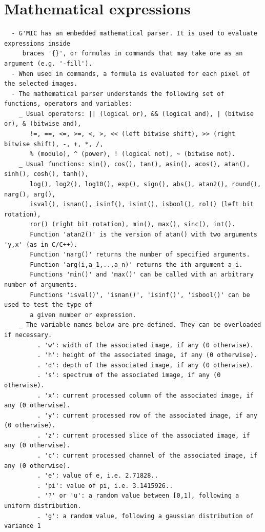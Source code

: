 \documentclass[a4paper,11pt,twoside]{book}
\begin{document}
\section{Mathematical expressions}
\small
\begin{lstlisting}
  - G'MIC has an embedded mathematical parser. It is used to evaluate expressions inside 
     braces '{}', or formulas in commands that may take one as an argument (e.g. '-fill'). 
  - When used in commands, a formula is evaluated for each pixel of the selected images. 
  - The mathematical parser understands the following set of functions, operators and variables: 
    _ Usual operators: || (logical or), && (logical and), | (bitwise or), & (bitwise and), 
       !=, ==, <=, >=, <, >, << (left bitwise shift), >> (right bitwise shift), -, +, *, /, 
       % (modulo), ^ (power), ! (logical not), ~ (bitwise not). 
    _ Usual functions: sin(), cos(), tan(), asin(), acos(), atan(), sinh(), cosh(), tanh(), 
       log(), log2(), log10(), exp(), sign(), abs(), atan2(), round(), narg(), arg(), 
       isval(), isnan(), isinf(), isint(), isbool(), rol() (left bit rotation), 
       ror() (right bit rotation), min(), max(), sinc(), int(). 
       Function 'atan2()' is the version of atan() with two arguments 'y,x' (as in C/C++). 
       Function 'narg()' returns the number of specified arguments. 
       Function 'arg(i,a_1,..,a_n)' returns the ith argument a_i. 
       Functions 'min()' and 'max()' can be called with an arbitrary number of arguments. 
       Functions 'isval()', 'isnan()', 'isinf()', 'isbool()' can be used to test the type of 
       a given number or expression. 
    _ The variable names below are pre-defined. They can be overloaded if necessary. 
         . 'w': width of the associated image, if any (0 otherwise). 
         . 'h': height of the associated image, if any (0 otherwise). 
         . 'd': depth of the associated image, if any (0 otherwise). 
         . 's': spectrum of the associated image, if any (0 otherwise). 
         . 'x': current processed column of the associated image, if any (0 otherwise). 
         . 'y': current processed row of the associated image, if any (0 otherwise). 
         . 'z': current processed slice of the associated image, if any (0 otherwise). 
         . 'c': current processed channel of the associated image, if any (0 otherwise). 
         . 'e': value of e, i.e. 2.71828.. 
         . 'pi': value of pi, i.e. 3.1415926.. 
         . '?' or 'u': a random value between [0,1], following a uniform distribution. 
         . 'g': a random value, following a gaussian distribution of variance 1 

\end{lstlisting}
\end{document}

